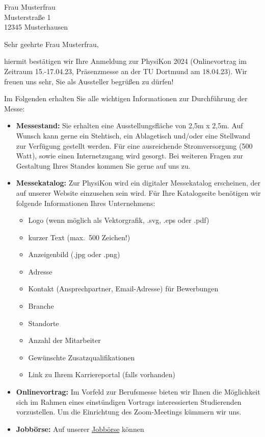 \documentclass[
  pepbrief,
  fontsize=12pt,
  paper=a4,
  DIV=14,
  parskip=half,
  backaddress=false,
]{scrlttr2}
\author{Netter PhysiKon Helfer}
\begin{document}
\begin{letter}{%
  Frau Musterfrau \\
  Musterstraße 1 \\
  12345 Musterhausen
}
\opening{Sehr geehrte Frau Musterfrau,}
hiermit bestätigen wir Ihre Anmeldung zur PhysiKon 2024 (Onlinevortrag im Zeitraum 15.-17.04.23, 
Präsenzmesse an der TU Dortmund am 18.04.23). 
Wir freuen uns sehr, Sie als Aussteller begrüßen zu dürfen!

Im Folgenden erhalten Sie alle wichtigen Informationen zur Durchführung der Messe:

\begin{itemize}
  \item \textbf{Messestand:} Sie erhalten eine Ausstellungsfläche von 2,5m x 2,5m.
    Auf Wunsch kann gerne ein Stehtisch, ein Ablagetisch und/oder eine Stellwand 
    zur Verfügung gestellt werden.
    Für eine ausreichende Stromversorgung (500 Watt), sowie einen Internetzugang wird gesorgt.
    Bei weiteren Fragen zur Gestaltung Ihres Standes kommen Sie gerne auf uns zu.
    \item \textbf{Messekatalog:} Zur PhysiKon wird ein digitaler Messekatalog erscheinen, der auf unserer Website 
    einzusehen sein wird.
    Für Ihre Katalogseite benötigen wir folgende Informationen Ihres Unternehmens:
    \begin{itemize}
      \item Logo (wenn möglich als Vektorgrafik, .svg, .eps oder .pdf)
      \item kurzer Text (max.\ 500 Zeichen!)
      \item Anzeigenbild (.jpg oder .png)
      \item Adresse
      \item Kontakt (Ansprechpartner, Email-Adresse) für Bewerbungen
      \item Branche
      \item Standorte
      \item Anzahl der Mitarbeiter
      \item Gewünschte Zusatzqualifikationen
      \item Link zu Ihrem Karriereportal (falls vorhanden)
    \end{itemize}
    \item \textbf{Onlinevortrag:} Im Vorfeld zur Berufsmesse bieten wir Ihnen die Möglichkeit sich im Rahmen eines einstündigen Vortrags interessierten
    Studierenden vorzustellen. Um die Einrichtung des Zoom-Meetings kümmern wir uns. 
    \item \textbf{Jobbörse:} Auf unserer \href{https://pep-dortmund.org/jobboerse/}{Jobbörse} können 

\end{itemize}
\end{letter}
\end{document}
